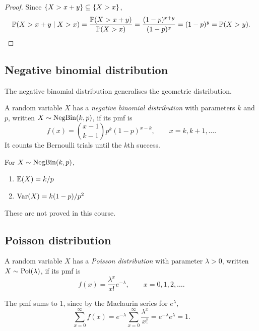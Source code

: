 \begin{proof}
Since $\left\{ X > x + y \right\} \subseteq \left\{ X > x \right\}$,
\[
  \mathbb{P}(X > x + y \mid X > x) = \frac{\mathbb{P}(X > x + y)}{\mathbb{P}(X > x)} = \frac{(1-p)^{x+y}}{(1-p)^x} = (1-p)^y = \mathbb{P}(X > y). \qedhere
\]
\end{proof}

\subsection{Negative binomial distribution}\label{sec:negative-binomial}

The negative binomial distribution generalises the geometric distribution.

\begin{definition}\label{def:negative-binomial}
A random variable $X$ has a \emph{negative binomial distribution} with parameters $k$ and $p$, written $X \sim \mathrm{NegBin}(k, p)$, if its pmf is
\[
  f(x) = \binom{x - 1}{k - 1} p^k (1-p)^{x-k}, \qquad x = k, k+1, \ldots.
\]
It counts the Bernoulli trials until the $k$th success.
\end{definition}

\begin{theorem}\label{thm:negative-binomial-properties}
For $X \sim \mathrm{NegBin}(k, p)$,
\begin{enumerate}
  \item $\operatorname{\mathbb{E}}(X) = k/p$
  \item $\operatorname{Var}(X) = k(1-p)/p^2$
\end{enumerate}
\end{theorem}

These are not proved in this course.

\subsection{Poisson distribution}\label{sec:poisson}

\begin{definition}\label{def:poisson}
A random variable $X$ has a \emph{Poisson distribution} with parameter $\lambda > 0$, written $X \sim \mathrm{Poi}(\lambda)$, if its pmf is
\[
  f(x) = \frac{\lambda^x}{x!} e^{-\lambda}, \qquad x = 0, 1, 2, \ldots.
\]
\end{definition}

The pmf sums to 1, since by the Maclaurin series for $e^\lambda$,
\[
  \sum_{x=0}^\infty f(x) = e^{-\lambda} \sum_{x=0}^\infty \frac{\lambda^x}{x!} = e^{-\lambda} e^{\lambda} = 1.
\]

